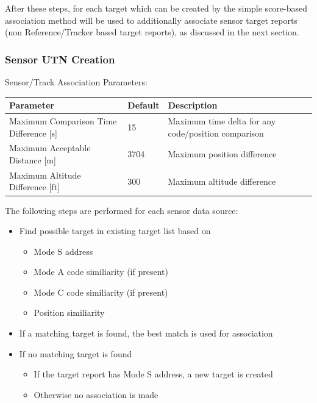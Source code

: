 After these steps, for each target which can be created by the simple score-based association method will be used to additionally associate sensor target reports (non Reference/Tracker based target reports), as discussed in the next section.

\subsubsection{Sensor UTN Creation}

Sensor/Track Association Parameters:
\begin{table}[H]
  \center
  \begin{tabularx}{\textwidth}{ | l | l | X |}
    \hline
    \textbf{Parameter} & \textbf{Default} &  \textbf{Description} \\ \hline
    Maximum Comparison Time Difference [s] & 15 & Maximum time delta for any code/position comparison \\ \hline
    Maximum Acceptable Distance [m] & 3704 & Maximum position difference \\ \hline
    Maximum Altitude Difference [ft] & 300 & Maximum altitude difference \\ \hline
  \end{tabularx}
\end{table}

The following steps are performed for each sensor data source:
\begin{itemize}
\item Find possible target in existing target list based on
\begin{itemize}
\item Mode S address
\item Mode A code similiarity (if present)
\item Mode C code similiarity (if present)
\item Position similiarity
\end{itemize}
\item If a matching target is found, the best match is used for association
\item If no matching target is found
\begin{itemize}
\item If the target report has Mode S address, a new target is created
\item Otherwise no association is made
\end{itemize}
\end{itemize}
\ \\

